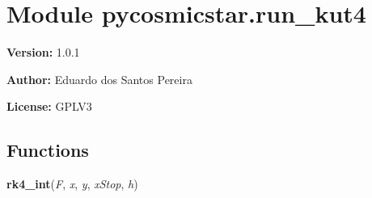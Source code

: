 %
%
%


\section{Module pycosmicstar.run\_kut4}

    \label{pycosmicstar:run_kut4}
\textbf{Version:} 1.0.1



\textbf{Author:} Eduardo dos Santos Pereira



\textbf{License:} GPLV3





  \subsection{Functions}

    \label{pycosmicstar:run_kut4:rk4_int}

    \vspace{0.5ex}

\hspace{.8\funcindent}\begin{boxedminipage}{\funcwidth}

    \raggedright \textbf{rk4\_int}(\textit{F}, \textit{x}, \textit{y}, \textit{xStop}, \textit{h})

\setlength{\parskip}{2ex}
\setlength{\parskip}{1ex}
    \end{boxedminipage}



